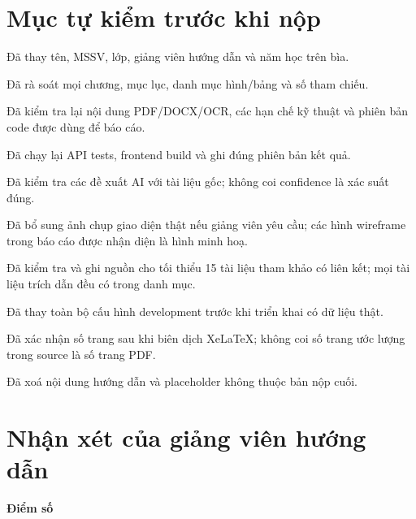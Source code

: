 \section{Mục tự kiểm trước khi nộp}
\label{sec:checklist}

\begin{tukiem}
  \item Đã thay tên, MSSV, lớp, giảng viên hướng dẫn và năm học trên bìa.
  \item Đã rà soát mọi chương, mục lục, danh mục hình/bảng và số tham chiếu.
  \item Đã kiểm tra lại nội dung PDF/DOCX/OCR, các hạn chế kỹ thuật và phiên
        bản code được dùng để báo cáo.
  \item Đã chạy lại API tests, frontend build và ghi đúng phiên bản kết quả.
  \item Đã kiểm tra các đề xuất AI với tài liệu gốc; không coi confidence là
        xác suất đúng.
  \item Đã bổ sung ảnh chụp giao diện thật nếu giảng viên yêu cầu; các hình
        wireframe trong báo cáo được nhận diện là hình minh hoạ.
  \item Đã kiểm tra và ghi nguồn cho tối thiểu 15 tài liệu tham khảo có liên
        kết; mọi tài liệu trích dẫn đều có trong danh mục.
  \item Đã thay toàn bộ cấu hình development trước khi triển khai có dữ liệu
        thật.
  \item Đã xác nhận số trang sau khi biên dịch XeLaTeX; không coi số trang
        ước lượng trong source là số trang PDF.
  \item Đã xoá nội dung hướng dẫn và placeholder không thuộc bản nộp cuối.
\end{tukiem}

\section{Nhận xét của giảng viên hướng dẫn}
\label{sec:nhanxet}

\khungnhanxet[7.5cm]

\vspace{0.8em}
\noindent\begin{minipage}[t]{0.5\textwidth}
\color{daunavy}
{\color{daumaroon}\bfseries Điểm số}

\vspace{0.7em}

\vspace{0.9em}
\end{minipage}\hfill
{}
